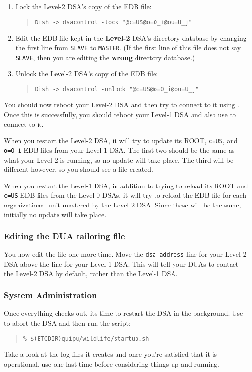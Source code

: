 \begin{enumerate}
\item	Lock the Level-2 DSA's copy of the EDB file:
\begin{quote}\small\begin{verbatim}
Dish -> dsacontrol -lock "@c=US@o=O_i@ou=U_j"
\end{verbatim}\end{quote}

\item	Edit the EDB file kept in the {\bf Level-2\/} DSA's directory
database by changing the first line from \verb"SLAVE" to \verb"MASTER".
(If the first line of this file does not say \verb"SLAVE",
then you are editing the {\bf wrong\/} directory database.)

\item	Unlock the Level-2 DSA's copy of the EDB file:
\begin{quote}\small\begin{verbatim}
Dish -> dsacontrol -unlock "@c=US@o=O_i@ou=U_j"
\end{verbatim}\end{quote}
\end{enumerate}
You should now reboot your Level-2 DSA and then try to connect to it using
.
Once this is successfully,
you should reboot your Level-1 DSA and also use  to connect to it.

When you restart the Level-2 DSA,
it will try to update its ROOT,
\verb"c=US",
and \verb"o=O_i" EDB files from your Level-1 DSA.
The first two should be the same as what your Level-2 is running,
so no update will take place.
The third will be different however,
so you should see a file  created.

When you restart the Level-1 DSA,
in addition to trying to reload its ROOT and \verb"c=US" EDB files from the
Level-0 DSAs,
it will try to reload the EDB file for each organizational unit mastered by
the Level-2 DSA.
Since these will be the same,
initially no update will take place.

\subsubsection	{Editing the DUA tailoring file}
You now edit the  file one more time.
Move the \verb"dsa_address" line for your Level-2 DSA above the line for your
Level-1 DSA.
This will tell your DUAs to contact the Level-2 DSA by default,
rather than the Level-1 DSA.

\subsubsection	{System Administration}
Once everything checks out,
its time to restart the DSA in the background.
Use  to abort the DSA and then run the  script:
\begin{quote}\small\begin{verbatim}
% $(ETCDIR)quipu/wildlife/startup.sh
\end{verbatim}\end{quote}
Take a look at the log files it creates and once you're satisfied
that it is operational,
use  one last time before considering things up and running.

